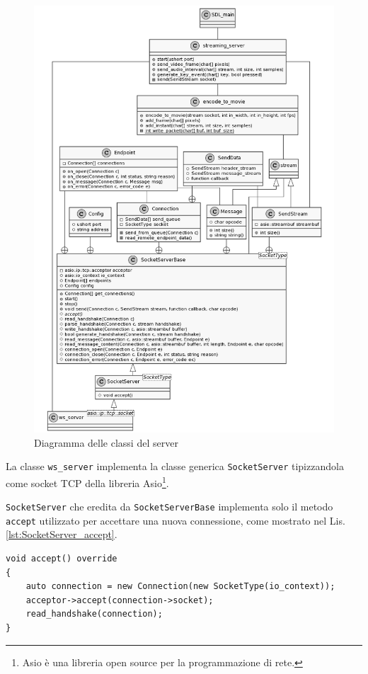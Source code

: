 \begin{figure}[H]
	\includegraphics[width=\linewidth]{immagini/class_server_and_encoding_full}
	\caption{Diagramma delle classi del server}
	\label{fig:class_server_and_encoding_full}
\end{figure}

La classe \verb|ws_server| implementa la classe generica \verb|SocketServer| tipizzandola come socket TCP della libreria Asio\footnote{Asio è una libreria open source per la programmazione di rete.}.

\verb|SocketServer| che eredita da \verb|SocketServerBase| implementa solo il metodo \verb|accept| utilizzato per accettare una nuova connessione, come mostrato nel Lis. \ref{lst:SocketServer_accept}.

\begin{lstlisting}[caption=Funzione accept della classe SocketServer. File: \detokenize{lib/util/server_ws_impl.hpp}, label={lst:SocketServer_accept}]
void accept() override
{
	auto connection = new Connection(new SocketType(io_context));
	acceptor->accept(connection->socket);
	read_handshake(connection);
}
\end{lstlisting}

